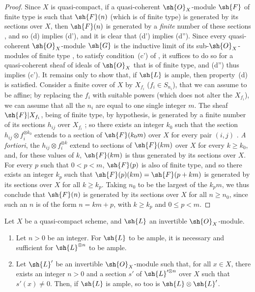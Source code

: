 \begin{proof}
Since $X$ is quasi-compact, if a quasi-coherent $\sh{O}_X$-module $\sh{F}$ of finite type is such that $\sh{F}(n)$ (which is of finite type) is generated by its sections over $X$, then $\sh{F}(n)$ is generated by a \emph{finite} number of these sections , and so (d) implies (d'), and it is clear that (d') implies (d'').
Since every quasi-coherent $\sh{O}_X$-module $\sh{G}$ is the inductive limit of its sub-$\sh{O}_X$-modules of finite type , to satisfy condition~(c') of , it suffices to do so for a quasi-coherent sheaf of ideals of $\sh{O}_X$ that is of finite type, and (d'') thus implies (c').
It remains only to show that, if $\sh{L}$ is ample, then property~(d) is satisfied.
Consider a finite cover of $X$ by $X_{f_i}$ ($f_i\in S_{n_i}$), that we can assume to be affine;
by replacing the $f_i$ with suitable powers (which does not alter the $X_{f_i}$), we can assume that all the $n_i$ are equal to one single integer $m$.
The sheaf $\sh{F}|X_{f_i}$, being of finite type, by hypothesis, is generated by a finite number of its sections $h_{ij}$ over $X_{f_i}$ ;
so there exists an integer $k_0$ such that the section $h_{ij}\otimes f_i^{\otimes k_0}$ extends to a section of $\sh{F}(k_0m)$ over $X$ for every pair $(i,j)$ .
\emph{A fortiori}, the $h_{ij}\otimes f_i^{\otimes k}$ extend to sections of $\sh{F}(km)$ over $X$ for every $k\geq k_0$, and, for these values of $k$, $\sh{F}(km)$ is thus generated by its sections over $X$.
For every $p$ such that $0<p<m$, $\sh{F}(p)$ is also of finite type, and so there exists an integer $k_p$ such that $\sh{F}(p)(km)=\sh{F}(p+km)$ is generated by its sections over $X$ for all $k\geq k_p$.
Taking $n_0$ to be the largest of the $k_pm$, we thus conclude that $\sh{F}(n)$ is generated by its sections over $X$ for all $n\geq n_0$, since such an $n$ is of the form $n=km+p$, with $k\geq k_p$ and $0\leq p<m$.
\end{proof}

\begin{proposition}[4.5.6]
\label{II.4.5.6}
  Let $X$ be a quasi-compact scheme, and $\sh{L}$ an invertible $\sh{O}_X$-module.
  \begin{enumerate}
    \item[\rm{(i)}] Let $n>0$ be an integer. For $\sh{L}$ to be ample, it is necessary and sufficient for $\sh{L}^{\otimes n}$ to be ample.
    \item[\rm{(ii)}] Let $\sh{L}'$ be an invertible $\sh{O}_X$-module such that, for all $x\in X$, there exists an integer $n>0$
      and a section $s'$ of $\sh{L}'^{\otimes n}$ over $X$ such that $s'(x)\neq0$.
      Then, if $\sh{L}$ is ample, so too is $\sh{L}\otimes\sh{L}'$.
  \end{enumerate}
\end{proposition}

